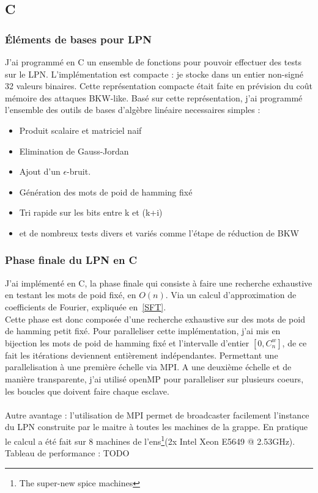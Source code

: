 \documentclass{article}		%
\begin{document}
\subsection{C}
\subsubsection{Éléments de bases pour LPN}
J'ai programmé en C un ensemble de fonctions pour pouvoir effectuer des
tests sur le LPN. L'implémentation est compacte : je stocke dans un
entier non-signé 32 valeurs binaires. Cette représentation compacte était
faite en prévision du coût mémoire des attaques BKW-like. Basé sur cette représentation, j'ai
programmé l'ensemble des outils de bases d'algèbre linéaire necessaires
simples :
\\
\begin{itemize}
\item Produit scalaire et matriciel naif 
\item Elimination de Gauss-Jordan
\item Ajout d'un $\epsilon$-bruit.
\item Génération des mots de poid de hamming fixé
\item Tri rapide sur les bits entre k et (k+i)
\item et de nombreux tests divers et variés comme l'étape de réduction de
BKW
\end{itemize}

\subsubsection{Phase finale du LPN en C}
J'ai implémenté en C, la phase finale qui consiste à faire une recherche
exhaustive en testant les mots de poid fixé, en $O(n)$. Via un calcul
d'approximation de coefficients de Fourier, expliquée en~\ref{SFT}.
\\
Cette phase est donc composée d'une recherche exhaustive sur des mots de
poid de hamming petit fixé. Pour paralleliser cette implémentation, j'ai
mis en bijection les mots de poid de hamming fixé et l'intervalle
d'entier $[0, C_{n}^{w}]$, de ce fait les itérations deviennent
entièrement indépendantes. Permettant une parallelisation à une première
échelle via MPI.
A une deuxième échelle et de manière transparente, j'ai utilisé openMP
pour paralleliser sur plusieurs coeurs, les boucles que doivent faire
chaque esclave. 
\\\\
Autre avantage : l'utilisation de MPI permet de broadcaster facilement
l'instance du LPN construite par le maitre à toutes les machines de la
grappe. En pratique le calcul a été fait sur 8 machines de
l'ens\footnote{The super-new spice machines}(2x Intel Xeon E5649 @
2.53GHz).  
Tableau de performance : TODO
\end{document}
